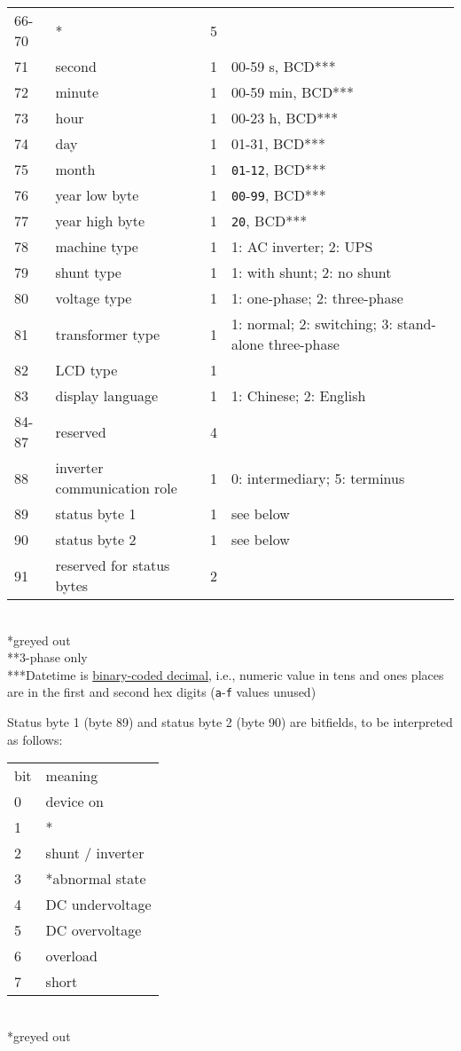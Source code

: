 \documentclass[pdftex,oneside,12pt,a4paper]{book}
\begin{document}
\begin{supertabular}{llll}
66-70 & * & 5 & \\
71 & second & 1 & 00-59 s, BCD*** \\
72 & minute & 1 & 00-59 min, BCD*** \\
73 & hour & 1 & 00-23 h, BCD*** \\
74 & day & 1 & 01-31, BCD*** \\
75 & month & 1 & \verb|01|-\verb|12|, BCD*** \\
76 & year low byte & 1 & \verb|00|-\verb|99|, BCD*** \\
77 & year high byte & 1 & \verb|20|, BCD*** \\
78 & machine type & 1 & 1: AC inverter; 2: UPS \\
79 & shunt type & 1 & 1: with shunt; 2: no shunt \\
80 & voltage type & 1 & 1: one-phase; 2: three-phase \\
81 & transformer type & 1 & 1: normal; 2: switching; 3: stand-alone three-phase\\
82 & LCD type & 1 & \\
83 & display language & 1 & 1: Chinese; 2: English \\
84-87 & reserved & 4 & \\
88 & inverter communication role & 1 & 0: intermediary; 5: terminus \\
89 & status byte 1 & 1 & see below \\
90 & status byte 2 & 1 & see below \\
91 & reserved for status bytes & 2 &\\
\end{supertabular}\\
{*}greyed out\\
{**}3-phase only\\
{***}Datetime is \href{http://en.wikipedia.org/wiki/Binary-coded_decimal}{binary-coded decimal}, i.e., numeric value in tens and ones places are in the first and second hex digits (\verb|a|-\verb|f| values unused)

Status byte 1 (byte 89) and status byte 2 (byte 90) are bitfields, to be interpreted as follows:\\
\begin{tabular}{ll}
bit & meaning\\
0 & device on \\
1 & * \\
2 & shunt / inverter \\
3 & *abnormal state \\
4 & DC undervoltage \\
5 & DC overvoltage \\
6 & overload \\
7 & short 
\end{tabular}\\
{*}greyed out
\end{document}
